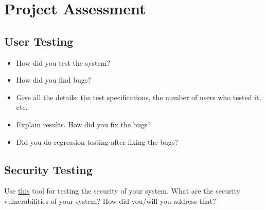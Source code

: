 
\section{Project Assessment}
    \subsection{User Testing}
    \begin{itemize}
        \item How did you test the system?
        \item How did you find bugs? 
        \item Give all the details: the test specifications, the number of users who tested it, etc.
        \item Explain results. How did you fix the bugs? 
        \item Did you do regression testing after fixing the bugs?
    \end{itemize}
    \subsection{Security Testing}
        Use \href{https://www.zaproxy.org/ }{this} tool for testing the security of your system. What are the security vulnerabilities of your system? How did you/will you address that?